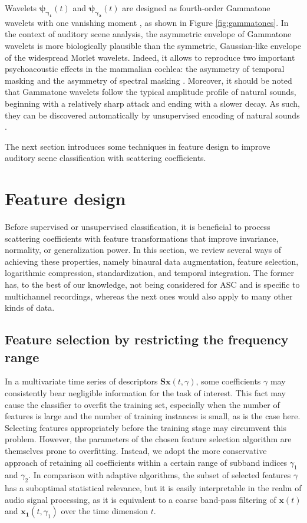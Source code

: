 \documentclass[journal]{IEEEtran}
\begin{document}
Wavelets
$\boldsymbol{\psi_{\gamma_1}}(t)$ and $\boldsymbol{\psi_{\gamma_2}}(t)$ are designed as fourth-order Gammatone
wavelets with one vanishing moment \cite{Venkitaraman2014}, as shown in Figure \ref{fig:gammatones}.
In the context of auditory scene analysis, the asymmetric envelope of Gammatone wavelets is more biologically plausible than the symmetric, Gaussian-like envelope of the widespread Morlet wavelets.
Indeed, it allows to reproduce two important psychoacoustic effects in the mammalian cochlea: the asymmetry of temporal masking and the asymmetry of spectral masking \cite{Fastl2007}.
Moreover, it should be noted that Gammatone wavelets follow the typical amplitude profile of natural sounds, beginning with a relatively sharp attack and ending with a slower decay.
As such, they can be discovered automatically by unsupervised encoding of natural sounds \cite{Smith2006}.

The next section introduces some techniques in feature design to improve auditory scene classification with scattering coefficients.

\section{Feature design}
Before supervised or unsupervised classification, it is beneficial to process scattering coefficients with feature transformations that improve invariance, normality, or generalization power. 
In this section, we review several ways of achieving these properties, namely binaural data augmentation, feature selection, logarithmic compression, standardization, and temporal integration.
The former has, to the best of our knowledge, not being considered for ASC and is specific to multichannel recordings, whereas the next ones would also apply to many other kinds of data.

\subsection{Feature selection by restricting the frequency range}
In a multivariate time series of descriptors $\mathbf{S}\boldsymbol{x}(t,\gamma)$, some coefficients $\gamma$ may consistently bear negligible information for the task of interest.
This fact may cause the classifier to overfit the training set, especially when the number of features is large and the number of training instances is small, as is the case here.
Selecting features appropriately before the training stage may circumvent this problem.
However, the parameters of the chosen feature selection algorithm are themselves prone to overfitting.
Instead, we adopt the more conservative approach of retaining all coefficients within a certain range of subband indices $\gamma_1$ and $\gamma_2$.
In comparison with adaptive algorithms, the subset of selected features $\gamma$ has a suboptimal statistical relevance, but it is easily interpretable in the realm of audio signal processing, as it is equivalent to a coarse band-pass filtering of $\boldsymbol{x}(t)$ and $\boldsymbol{x_1}(t,\gamma_1)$ over the time dimension $t$.
\end{document}
